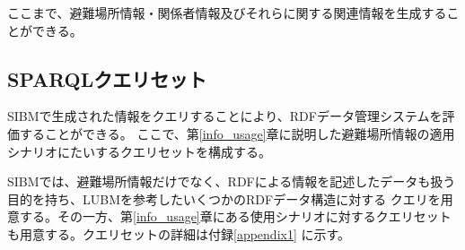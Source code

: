 ここまで、避難場所情報・関係者情報及びそれらに関する関連情報を生成することができる。

\subsection{SPARQLクエリセット}

SIBMで生成された情報をクエリすることにより、RDFデータ管理システムを評価することができる。
ここで、第\ref{info_usage}章に説明した避難場所情報の適用シナリオにたいするクエリセットを構成する。

SIBMでは、避難場所情報だけでなく、RDFによる情報を記述したデータも扱う目的を持ち、LUBMを参考したいくつかのRDFデータ構造に対する
クエリを用意する。その一方、第\ref{info_usage}章にある使用シナリオに対するクエリセットも用意する。クエリセットの詳細は付録\ref{appendix1}
に示す。